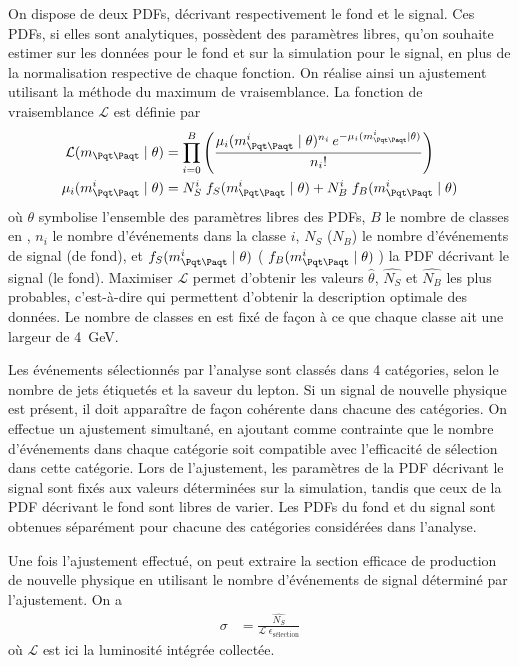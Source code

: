 On dispose de deux PDFs, décrivant respectivement le fond et le signal. Ces PDFs, si elles sont analytiques, possèdent des paramètres libres, qu'on souhaite estimer sur les données pour le fond et sur la simulation pour le signal, en plus de la normalisation respective de chaque fonction. On réalise ainsi un ajustement utilisant la méthode du maximum de vraisemblance. La fonction de vraisemblance $\mathcal{L}$ est définie par
\begin{align*}
  \mathcal{L}(\mtt \mid \theta) &= \prod\limits_{i = 0}^B \left( \frac{\mu_i(\mtt^i \mid \theta)^{n_i} \, e^{- \mu_i(\mtt^i \mid \theta)}}{n_i!} \right) \\
  \mu_i(\mtt^i \mid \theta) &= N_S^i \; f_S(\mtt^i \mid \theta) + N_B^i \; f_B(\mtt^i \mid \theta)
\end{align*}
où $\theta$ symbolise l'ensemble des paramètres libres des PDFs, $B$ le nombre de classes en \mtt, $n_i$ le nombre d'événements dans la classe $i$, $N_S$ ($N_B$) le nombre d'événements de signal (de fond), et $f_S(\mtt^i \mid \theta)$ ($\;f_B(\mtt^i \mid \theta)\;$) la PDF décrivant le signal (le fond). Maximiser $\mathcal{L}$ permet d'obtenir les valeurs $\hat{\theta}$, $\hat{N_S}$ et $\hat{N_B}$ les plus probables, c'est-à-dire qui permettent d'obtenir la description optimale des données. Le nombre de classes en \mtt est fixé de façon à ce que chaque classe ait une largeur de \SI{4}{\GeV}.

\medskip

Les événements sélectionnés par l'analyse sont classés dans 4 catégories, selon le nombre de jets étiquetés \Pbottom et la saveur du lepton. Si un signal de nouvelle physique est présent, il doit apparaître de façon cohérente dans chacune des catégories. On effectue un ajustement simultané, en ajoutant comme contrainte que le nombre d'événements dans chaque catégorie soit compatible avec l'efficacité de sélection dans cette catégorie. Lors de l’ajustement, les paramètres de la PDF décrivant le signal sont fixés aux valeurs déterminées sur la simulation, tandis que ceux de la PDF décrivant le fond sont libres de varier. Les PDFs du fond et du signal sont obtenues séparément pour chacune des catégories considérées dans l'analyse.

\bigskip

Une fois l'ajustement effectué, on peut extraire la section efficace de production de nouvelle physique en utilisant le nombre d'événements de signal déterminé par l'ajustement. On a
\begin{align} \label{eq:cross_section}
  \sigma &= \frac{\hat{N_S}}{\mathcal{L} \; \epsilon_{\text{sélection}}}
\end{align}
où $\mathcal{L}$ est ici la luminosité intégrée collectée.


